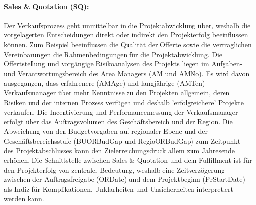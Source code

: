 \paragraph{Sales \& Quotation (SQ):} Der Verkaufsprozess geht unmittelbar in die Projektabwicklung über, weshalb die vorgelagerten Entscheidungen direkt oder indirekt den Projekterfolg beeinflussen können. Zum Beispiel beeinflussen die Qualität der Offerte sowie die vertraglichen Vereinbarungen die Rahmenbedingungen für die Projektabwicklung. Die Offertstellung und vorgängige Risikoanalysen des Projekts liegen im Aufgaben- und Verantwortungsbereich des Area Managers (AM und AMNo). Es wird davon ausgegangen, dass erfahrenere (AMAge) und langjährige (AMTen) Verkaufsmanager über mehr Kenntnisse zu den Projekten allgemein, deren Risiken und der internen Prozess verfügen und deshalb 'erfolgreichere' Projekte verkaufen. Die Incentivierung und Performancemessung der Verkaufsmanager erfolgt über das Auftragsvolumen des Geschäftsbereich und der Region. Die Abweichung von den Budgetvorgaben auf regionaler Ebene und der Geschäftsbereichsstufe (BUORBudGap und RegioORBudGap) zum Zeitpunkt des Projektabschlusses kann den Zielerreichungsdruck allem zum Jahresende erhöhen. Die Schnittstelle zwischen Sales \& Quotation und dem Fulfillment ist für den Projekterfolg von zentraler Bedeutung, weshalb eine Zeitverzögerung zwischen der Auftragsfreigabe (ORDate) und dem Projektbeginn (PrStartDate) als Indiz für Komplikationen, Unklarheiten und Unsicherheiten interpretiert werden kann. 
